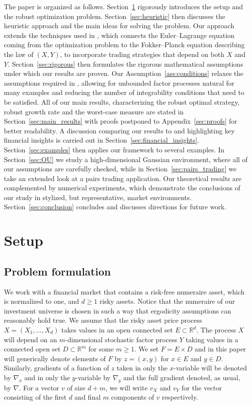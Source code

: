 \documentclass{article}
\theoremstyle{plain}
\theoremstyle{definition}
\newcommand{\R}{\mathbb{R}}
\numberwithin{lem}{section}
\begin{document}
The paper is organized as follows. Section~\ref{sec:setup} rigorously introduces the setup and the robust optimization problem. Section~\ref{sec:heuristic} then discusses the heuristic approach and the main ideas for solving the problem. Our approach extends the techniques used in \cite{kardaras2021ergodic,itkin2025ergodic}, which connects the Euler--Lagrange equation coming from the optimization problem to the Fokker--Planck equation describing the law of $(X,Y)$, to incorporate trading strategies that depend on both $X$ and $Y$. Section~\ref{sec:rigorous} then formulates the rigorous mathematical assumptions under which our results are proven. Our Assumption~\ref{ass:conditions} relaxes the assumptions required in \cite{itkin2025ergodic}, allowing for unbounded factor processes natural for many examples and reducing the number of integrability conditions that need to be satisfied. All of our main results, characterizing the robust optimal strategy, robust growth rate and the worst-case measure are stated in Section~\ref{sec:main_results} with proofs postponed to Appendix~\ref{sec:proofs} for better readability. A discussion comparing our results to \cite{itkin2025ergodic} and highlighting key financial insights is carried out in Section~\ref{sec:financial_insights}. Section~\ref{sec:examples} then applies our framework to several examples. In Section~\ref{sec:OU} we study a high-dimensional Gaussian environment, where all of our assumptions are carefully checked, while in Section~\ref{sec:pairs_trading} we take an extended look at a pairs trading application. Our theoretical results are complemented by numerical experiments, which demonstrate the conclusions of our study in stylized, but representative, market environments. Section~\ref{sec:conclusion} concludes and discusses directions for future work.

\section{Setup} \label{sec:setup}
\subsection{Problem formulation} \label{sec:problem_formulation}
We work with a financial market that contains a risk-free numeraire asset, which is normalized to one, and $d \geq 1$ risky assets. Notice that the numeraire of our investment universe is chosen in such a way that ergodicity assumptions can reasonably hold true. We assume that the risky asset price process $X = (X_1,\dots,X_d)$ takes values in an open connected set $E \subset \R^d$. The process $X$ will depend on an $m$-dimensional stochastic factor process $Y$ taking values in a connected open set $D \subset \R^m$ for some $m \geq 1$. We set $F = E \times D$ and in this paper will generically denote elements of $F$  by $z = (x,y)$ for $x \in E$ and $y \in D$. Similarly, gradients of a function of $z$ taken in only the $x$-variable will be denoted by $\nabla_x$ and in only the $y$-variable by $\nabla_y$ and the full gradient denoted, as usual, by $\nabla$. For a vector $v$ of size $d+m$, we will write $v_X$ and $v_Y$ for the vector consisting of the first $d$ and final $m$ components of $v$ respectively.
\end{document}
